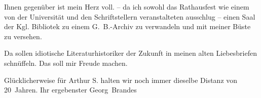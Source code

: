 \pstart
           Ihnen gegenüber ist mein Herz voll. \label{K_L02051-1v}\label{K_L02051-1} – da ich sowohl das Rathausfest wie einem von
               der Universität und den Schriftstellern veranstalteten ausschlug – einen Saal der Kgl. Bibliotek zu einem G. B.-Archiv zu verwandeln und mit meiner Büste zu versehen.\pend
           
\pstart
           Da sollen idiotische Literaturhistoriker der Zukunft in meinen alten Liebesbriefen
               schnüffeln. Das soll mir Freude machen.\pend
           
\pstart
           Glücklicherweise für Arthur S. halten wir noch immer dieselbe Distanz von
               20 Jahren.\pend
           \pstart Ihr ergebenster \spacefill\mbox{Georg Brandes}\pend{}\endnumbering{}  
      